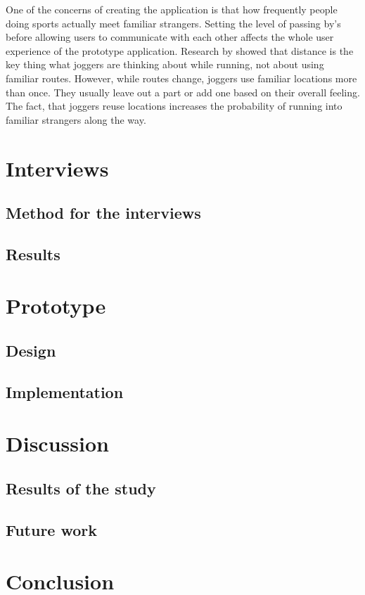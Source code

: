 One of the concerns of creating the application is that how frequently people doing sports actually meet familiar strangers. Setting the level of passing by's before allowing users to communicate with each other affects the whole user experience of the prototype application. Research by \cite{runningNavigation} showed that distance is the key thing what joggers are thinking about while running, not about using familiar routes. However, while routes change, joggers use familiar locations more than once. They usually leave out a part or add one based on their overall feeling. The fact, that joggers reuse locations increases the probability of running into familiar strangers along the way.

\section{Interviews}
\subsection{Method for the interviews}
\subsection{Results}

\section{Prototype}
\subsection{Design}
\subsection{Implementation}

\section{Discussion}
\subsection{Results of the study}
\subsection{Future work}

\section{Conclusion}

